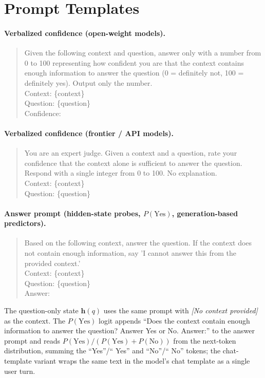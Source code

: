 \documentclass[acmsmall,screen,review]{acmart}
\begin{document}
\section{Prompt Templates}
\label{sec:prompts}

\paragraph{Verbalized confidence (open-weight models).}
\begin{quote}\small
Given the following context and question, answer only with a number from 0 to 100 representing how confident you are that the context contains enough information to answer the question (0 = definitely not, 100 = definitely yes). Output only the number.\\
Context: \{context\}\\
Question: \{question\}\\
Confidence:
\end{quote}

\paragraph{Verbalized confidence (frontier / API models).}
\begin{quote}\small
You are an expert judge. Given a context and a question, rate your confidence that the context alone is sufficient to answer the question. Respond with a single integer from 0 to 100. No explanation.\\
Context: \{context\}\\
Question: \{question\}
\end{quote}

\paragraph{Answer prompt (hidden-state probes, $P(\text{Yes})$, generation-based predictors).}
\begin{quote}\small
Based on the following context, answer the question. If the context does not contain enough information, say 'I cannot answer this from the provided context.'\\
Context: \{context\}\\
Question: \{question\}\\
Answer:
\end{quote}
The question-only state $\mathbf{h}(q)$ uses the same prompt with \emph{[No context provided]} as the context. The $P(\text{Yes})$ logit appends ``Does the context contain enough information to answer the question? Answer Yes or No. Answer:'' to the answer prompt and reads $P(\text{Yes}) / (P(\text{Yes}) + P(\text{No}))$ from the next-token distribution, summing the ``Yes''/`` Yes'' and ``No''/`` No'' tokens; the chat-template variant wraps the same text in the model's chat template as a single user turn.
\end{document}
